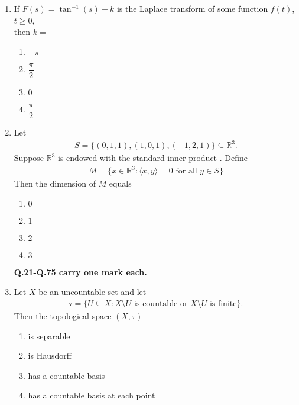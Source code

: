 \documentclass[journal]{IEEEtran}
\numberwithin{equation}{enumi}
\numberwithin{figure}{enumi}
\begin{document}
\begin{enumerate}
\item If $F(s) = \tan^{-1}(s) + k$ is the Laplace transform of some function  $f(t)$, $t \ge 0$, \\then $k =$   \hfill{}
\begin{multicols}{4}
\begin{enumerate}
    \item $-\pi$
    \item $\dfrac{\pi}{2}$
    \item $0$
    \item $\dfrac{\pi}{2}$ 
\end{enumerate}
\end{multicols}
 

\item Let
\begin{align*}
S = \{(0,1,1), (1,0,1), (-1,2,1)\} \subseteq \mathbb{R}^3.
\end{align*}
Suppose $\mathbb{R}^3$ is endowed with the standard inner product . Define 
\begin{align*}
M = \{x \in \mathbb{R}^3 : \langle x, y \rangle = 0 \text{ for all } y \in S\}
\end{align*}
Then the dimension of $M$ equals \hfill{}
\begin{multicols}{4}
\begin{enumerate}
    \item $0$
    \item $1$
    \item $2$
    \item $3$ 
\end{enumerate}
\end{multicols}


\newpage
\begin{center}
    \textbf{Q.21-Q.75 carry one mark each.}
\end{center}
\vspace{1em}

\item Let $X$ be an uncountable set and let
\begin{align*}
\tau = \{U \subseteq X : X \setminus U \text{ is countable or } X \setminus U \text{ is finite} \}.
\end{align*}
Then the topological space $(X, \tau)$        \hfill{}
\begin{enumerate}
    \item is separable
    \item is Hausdorff
    \item has a countable basis
    \item has a countable basis at each point
\end{enumerate}




\end{enumerate}
\end{document}

